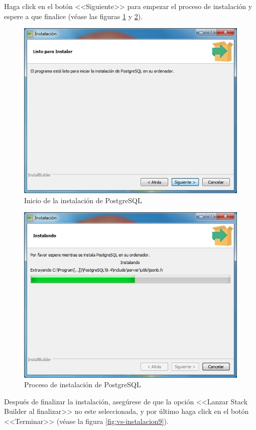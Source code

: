 \newpage

Haga click en el bot\'{o}n <<Siguiente>> para empezar el proceso de instalaci\'{o}n y espere a que finalice (v\'{e}ase las figuras \ref{fig:postgres7} y \ref{fig:postgres8}).

\begin{figure}[H]
  \centering
  \includegraphics[width=.7\linewidth]{./img/postgres7.jpg}
\caption[Inicio de la instalaci\'{o}n de PostgreSQL]{Inicio de la instalaci\'{o}n de PostgreSQL\label{fig:postgres7}}
\end{figure}

\begin{figure}[H]
  \centering
  \includegraphics[width=.7\linewidth]{./img/postgres8.jpg}
\caption[Proceso de instalaci\'{o}n de PostgreSQL]{Proceso de instalaci\'{o}n de PostgreSQL\label{fig:postgres8}}
\end{figure}

\newpage

Despu\'{e}s de finalizar la instalaci\'{o}n, aseg\'{u}rese de que la opci\'{o}n <<Lanzar Stack Builder al finalizar>> no este seleccionada, y por \'{u}ltimo haga click en el bot\'{o}n <<Terminar>> (v\'{e}ase la figura \ref{fig:vs-instalacion9}).	


